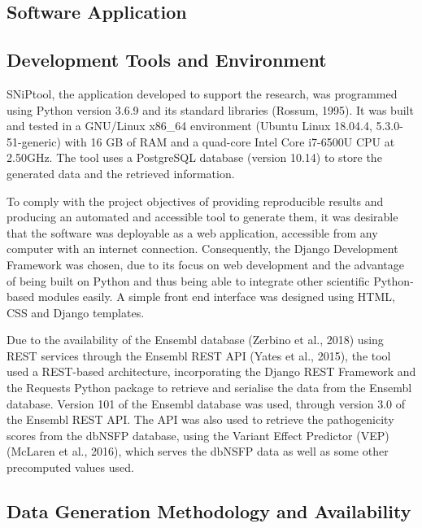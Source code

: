 \documentclass[12pt,MSc,wordcount,anon]{muthesis}
\begin{document}
\begin{flushleft}
\section{Software Application}

\subsection{Development Tools and Environment}

SNiPtool, the application developed to support the research, was programmed using Python version 3.6.9 and its standard libraries (Rossum, 1995). It was built and tested in a GNU/Linux x86\_64 environment (Ubuntu Linux 18.04.4, 5.3.0-51-generic) with 16 GB of RAM and a quad-core Intel Core i7-6500U CPU at 2.50GHz. The tool uses a PostgreSQL database (version 10.14) to store the generated data and the retrieved information.

To comply with the project objectives of providing reproducible results and producing an automated and accessible tool to generate them, it was desirable that the software was deployable as a web application, accessible from any computer with an internet connection. Consequently, the Django Development Framework was chosen, due to its focus on web development and the advantage of being built on Python and thus being able to integrate other scientific Python-based modules easily. A simple front end interface was designed using HTML, CSS and Django templates.

Due to the availability of the Ensembl database (Zerbino et al., 2018) using REST services through the Ensembl REST API (Yates et al., 2015), the tool used a REST-based architecture, incorporating the Django REST Framework and the Requests Python package to retrieve and serialise the data from the Ensembl database. Version 101 of the Ensembl database was used, through version 3.0 of the Ensembl REST API. The API was also used to retrieve the pathogenicity scores from the dbNSFP database, using the Variant Effect Predictor (VEP) (McLaren et al., 2016), which serves the dbNSFP data as well as some other precomputed values used.

\subsection{Data Generation Methodology and Availability}


\end{flushleft}
\end{document}
